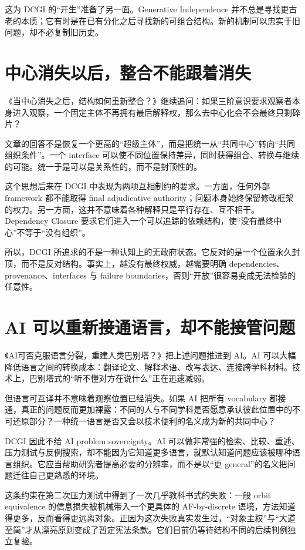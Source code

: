 \documentclass[UTF8,zihao=-4,fontset=none,oneside,openany]{ctexbook}
\begin{document}
这为 DCGI 的“开生”准备了另一面。Generative Independence 并不总是寻找更古老的本质；它有时是在已有分化之后寻找新的可组合结构。新的机制可以忠实于旧问题，却不必复制旧历史。

\section{中心消失以后，整合不能跟着消失}

《当中心消失之后，结构如何重新整合？》继续追问：如果三阶意识要求观察者本身进入观察，一个固定主体不再拥有最后解释权，那么去中心化会不会最终只剩碎片？\citep{peng-center}

文章的回答不是恢复一个更高的“超级主体”，而是把统一从“共同中心”转向“共同组织条件”。一个 interface 可以使不同位置保持差异，同时获得组合、转换与继续的可能。统一于是可以是关系性的，而不是封顶性的。

这个思想后来在 DCGI 中表现为两项互相制约的要求。一方面，任何外部 framework 都不能取得 final adjudicative authority；问题本身始终保留修改框架的权力。另一方面，这并不意味着各种解释只是平行存在、互不相干。Dependency Closure 要求它们进入一个可以追踪的依赖结构，使“没有最终中心”不等于“没有组织”。

所以，DCGI 所追求的不是一种认知上的无政府状态。它反对的是一个位置永久封顶，而不是反对结构。事实上，越没有最终权威，越需要明确 dependencies、provenance、interfaces 与 failure boundaries，否则“开放”很容易变成无法检验的任意性。

\section{AI 可以重新接通语言，却不能接管问题}

《AI可否克服语言分裂，重建人类巴别塔？》把上述问题推进到 AI。AI 可以大幅降低语言之间的转换成本：翻译论文、解释术语、改写表达、连接跨学科材料。技术上，巴别塔式的“听不懂对方在说什么”正在迅速减弱。\citep{peng-babel}

但语言可互译并不意味着观察位置已经消失。如果 AI 把所有 vocabulary 都接通，真正的问题反而更加裸露：不同的人与不同学科是否愿意承认彼此位置中的不可还原部分？一种统一语言是否又会以技术便利的名义成为新的共同中心？

DCGI 因此不给 AI problem sovereignty。AI 可以做非常强的检索、比较、重述、压力测试与反例搜索，却不能因为它知道更多语言，就默认知道问题应该被哪种语言组织。它应当帮助研究者提高必要的分辨率，而不是以“更 general”的名义把问题迁往自己更熟悉的环境。

这条约束在第二次压力测试中得到了一次几乎教科书式的失败：一般 orbit equivalence 的信息损失被机械带入一个更具体的 AF-by-discrete 语境，方法知道得更多，反而看得更远离对象。正因为这次失败真实发生过，“对象主权”与“大道至简”才从漂亮原则变成了暂定宪法条款。它们目前仍等待结构不同的后续判例独立复验。
\end{document}
